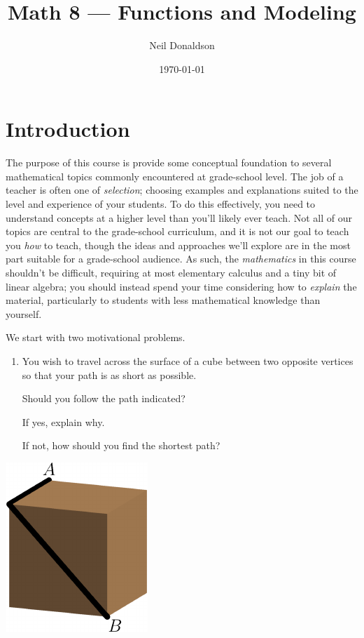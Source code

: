 \graphicspath{{1functions/asy/}}
\thispagestyle{empty}

\title{Math 8 --- Functions and Modeling}
\author{Neil Donaldson}
\date{\today}
\maketitle	

\section*{Introduction}

The purpose of this course is provide some conceptual foundation to several mathematical topics commonly encountered at grade-school level. The job of a teacher is often one of \emph{selection}; choosing examples and explanations suited to the level and experience of your students. To do this effectively, you need to understand concepts at a higher level than you'll likely ever teach. Not all of our topics are central to the grade-school curriculum, and it is not our goal to teach you \emph{how} to teach, though the ideas and approaches we'll explore are in the most part suitable for a grade-school audience. As such, the \emph{mathematics} in this course shouldn't be difficult, requiring at most elementary calculus and a tiny bit of linear algebra; you should instead spend your time considering how to \emph{explain} the material, particularly to students with less mathematical knowledge than yourself.\par

\begin{minipage}[t]{0.72\linewidth}\vspace{0pt}
We start with two motivational problems.\footnotemark
\begin{enumerate}
  \item You wish to travel across the surface of a cube between two opposite vertices so that your path is as short as possible.\par
  Should you follow the path indicated?\par
  If yes, explain why.\par
  If not, how should you find the shortest path?
\end{enumerate}
\end{minipage}\hfill\begin{minipage}[t]{0.25\linewidth}\vspace{-10pt}
\flushright\includegraphics{intro-cube_0}
\end{minipage}\smallbreak

